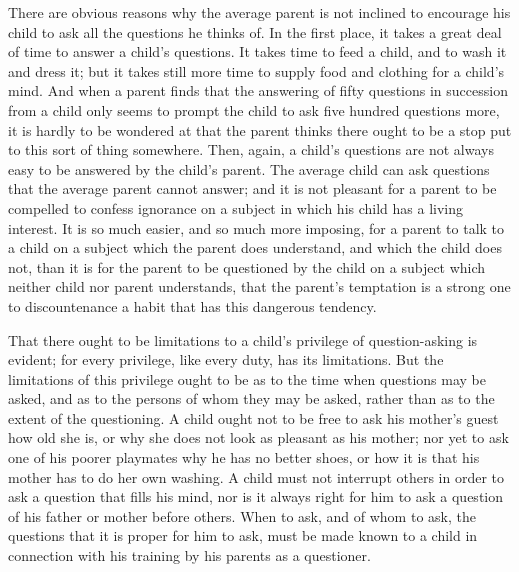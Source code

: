 \documentclass[
]{book}
\begin{document}
There are obvious reasons why the average parent is not inclined to encourage his child to ask all the questions he thinks of. In the first place, it takes a great deal of time to answer a child's questions. It takes time to feed a child, and to wash it and dress it; but it takes still more time to supply food and clothing for a child's mind. And when a parent finds that the answering of fifty questions in succession from a child only seems to prompt the child to ask five hundred questions more, it is hardly to be wondered at that the parent thinks there ought to be a stop put to this sort of thing somewhere. Then, again, a child's questions are not always easy to be answered by the child's parent. The average child can ask questions that the average parent cannot answer; and it is not pleasant for a parent to be compelled to confess ignorance on a subject in which his child has a living interest. It is so much easier, and so much more imposing, for a parent to talk to a child on a subject which the parent does understand, and which the child does not, than it is for the parent to be questioned by the child on a subject which neither child nor parent understands, that the parent's temptation is a strong one to discountenance a habit that has this dangerous tendency.

That there ought to be limitations to a child's privilege of question-asking is evident; for every privilege, like every duty, has its limitations. But the limitations of this privilege ought to be as to the time when questions may be asked, and as to the persons of whom they may be asked, rather than as to the extent of the questioning. A child ought not to be free to ask his mother's guest how old she is, or why she does not look as pleasant as his mother; nor yet to ask one of his poorer playmates why he has no better shoes, or how it is that his mother has to do her own washing. A child must not interrupt others in order to ask a question that fills his mind, nor is it always right for him to ask a question of his father or mother before others. When to ask, and of whom to ask, the questions that it is proper for him to ask, must be made known to a child in connection with his training by his parents as a questioner.
\end{document}
